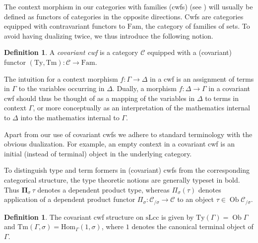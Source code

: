 \documentclass[a4paper]{article}
\theoremstyle{remark}
\theoremstyle{definition}
\newtheorem{definition}[theorem]{Definition}
\begin{document}
The context morphism in our categories with families (cwfs) (see \cite{internal-type-theory}) will usually be defined as functors of categories in the opposite directions.
Cwfs are categories equipped with contravariant functors to $\mathrm{Fam}$, the category of families of sets.
To avoid having dualizing twice, we thus introduce the following notion.
\begin{definition}
  A \emph{covariant cwf} is a category $\mathcal{C}$ equipped with a (covariant) functor $(\mathrm{Ty}, \mathrm{Tm}) : \mathcal{C} \rightarrow \mathrm{Fam}$.
\end{definition}
The intuition for a context morphism $f : \Gamma \rightarrow \Delta$ in a cwf is an assignment of terms in $\Gamma$ to the variables occurring in $\Delta$.
Dually, a morphism $f : \Delta \rightarrow \Gamma$ in a covariant cwf should thus be thought of as a mapping of the variables in $\Delta$ to terms in context $\Gamma$, or more conceptually as an interpretation of the mathematics internal to $\Delta$ into the mathematics internal to $\Gamma$.

Apart from our use of covariant cwfs we adhere to standard terminology with the obvious dualization.
For example, an empty context in a covariant cwf is an initial (instead of terminal) object in the underlying category.

To distinguish type and term formers in (covariant) cwfs from the corresponding categorical structure, the type theoretic notions are generally typeset in bold.
Thus $\mathbf{\Pi}_\sigma \, \tau$ denotes a dependent product type, whereas $\Pi_\sigma(\tau)$ denotes application of a dependent product functor $\Pi_\sigma : \mathcal{C}_{/ \sigma} \rightarrow \mathcal{C}$ to an object $\tau \in \operatorname{Ob} \mathcal{C}_{/ \sigma}$.

\begin{definition}
  The covariant cwf structure on $\mathrm{sLcc}$ is given by $\mathrm{Ty}(\Gamma) = \operatorname{Ob} \Gamma$ and $\mathrm{Tm}(\Gamma, \sigma) = \mathrm{Hom}_\Gamma(1, \sigma)$, where $1$ denotes the canonical terminal object of $\Gamma$.
\end{definition}
\end{document}
